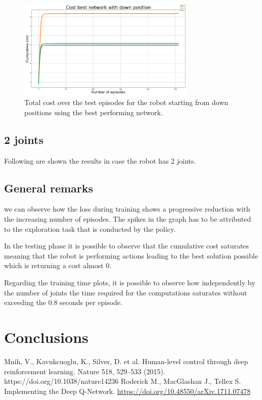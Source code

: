 \documentclass[twocolumn, a4paper]{article}
\begin{document}
\vspace{-1cm}
\label{fig:Test_1_best_down_pos}
\begin{figure}[H]
	\centering
	\includegraphics[width=8.5cm]{"../Figures/loss_best_net_down_positions_1J_500E_256EL.png"}
	\caption{Total cost over the test episodes for the robot starting from
			 down positions using the best performing network.}
\end{figure}

\subsection{2 joints}
Following are shown the results in case the robot has 2 joints.


\subsection{General remarks}
we can observe how the loss during
training shows a progressive reduction with the increasing number of episodes.
The spikes in the graph has to be attributed to the exploration task that
is conducted by the policy.

In the testing phase it is possible to observe that the cumulative cost
saturates meaning that the robot is performing actions leading to the best
solution possible which is returning a cost almost 0.

Regarding the training time plots, it is possible to observe how independently
by the number of joints the time required for the computations saturates
without exceeding the 0.8 seconds per episode.
\newpage
\section{Conclusions}

\begin{thebibliography}{9}
	Mnih, V., Kavukcuoglu, K., Silver, D. et al. Human-level control through
	deep reinforcement learning. Nature 518, 529–533 (2015).
	https://doi.org/10.1038/nature14236
	Roderick M., MacGlashan J., Tellex S. Implementing the Deep Q-Network.
	\href{https://doi.org/10.48550/arXiv.1711.07478}
		 {https://doi.org/10.48550/arXiv.1711.07478}
\end{thebibliography}
\end{document}
